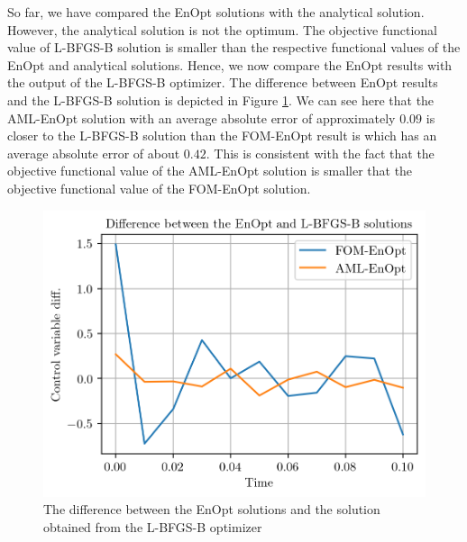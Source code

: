 So far, we have compared the EnOpt solutions with the analytical solution. However, the analytical solution is not the optimum. The objective functional value of L-BFGS-B solution is smaller than the respective functional values of the EnOpt and analytical solutions. Hence, we now compare the EnOpt results with the output of the L-BFGS-B optimizer. The difference between EnOpt results and the L-BFGS-B solution is depicted in Figure \ref{EnOptLBFGSBDifferPlot}. We can see here that the AML-EnOpt solution with an average absolute error of approximately $0.09$ is closer to the L-BFGS-B solution than the FOM-EnOpt result is which has an average absolute error of about $0.42$. This is consistent with the fact that the objective functional value of the AML-EnOpt solution is smaller that the objective functional value of the FOM-EnOpt solution.\\

\begin{figure}
\centering
\includegraphics{Plots/EnOptLBFGSBDiffer.png}
\caption{\label{EnOptLBFGSBDifferPlot}The difference between the EnOpt solutions and the solution obtained from the L-BFGS-B optimizer}
\end{figure}



